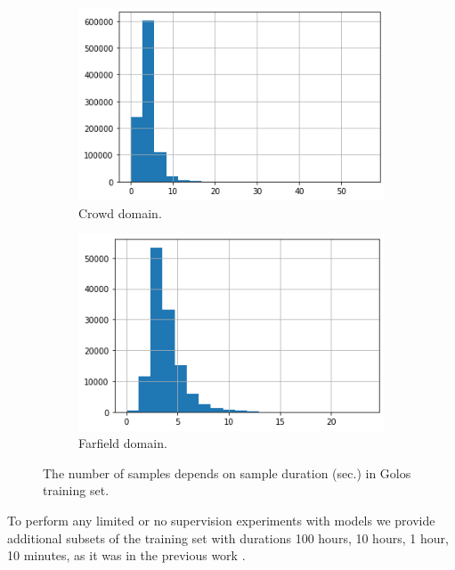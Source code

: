 \documentclass[a4paper]{article}
\begin{document}
\begin{figure}[ht]
\begin{subfigure}{.49\linewidth}
  \centering
  \includegraphics[width=1.\linewidth]{LaTeX/img/toloka_lens.png}  
  \caption{Crowd domain.}
  \label{fig:sub-first}
\end{subfigure}
\begin{subfigure}{.49\linewidth}
  \centering
  \includegraphics[width=1.\linewidth]{LaTeX/img/portal_lens.png}  
  \caption{Farfield domain.}
  \label{fig:sub-second}
\end{subfigure}
\caption{The number of samples depends on sample duration (sec.) in Golos training set.}
\label{fig:duration_distribution}
\end{figure}

To perform any limited or no supervision experiments with models we provide additional subsets of the training set with durations 100 hours, 10 hours, 1 hour, 10 minutes, as it was in the previous work \cite{kahn2020libri}.
\end{document}
